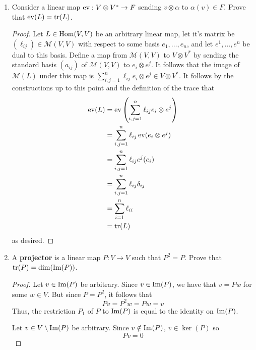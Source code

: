 \documentclass[../psets.tex]{subfiles}
\begin{document}
\begin{enumerate}
\begin{enumerate}
\begin{proof}
            where $1\in\Hom(V,V)$ is the identity map.
        \end{proof}
        \item Consider a linear map $\operatorname{ev}:V\otimes V^*\to F$ sending $v\otimes\alpha$ to $\alpha(v)\in F$. Prove that $\operatorname{ev}(L)=\tr(L)$.
        \begin{proof}
            Let $L\in\operatorname{Hom}(V,V)$ be an arbitrary linear map, let it's matrix be $(\ell_{ij})\in\mathcal{M}(V,V)$ with respect to some basis $e_1,\dots,e_n$, and let $e^1,\dots,e^n$ be dual to this basis. Define a map from $\mathcal{M}(V,V)$ to $V\otimes V^*$ by sending the standard basis $(a_{ij})$ of $\mathcal{M}(V,V)$ to $e_i\otimes e^j$. It follows that the image of $\mathcal{M}(L)$ under this map is $\sum_{i,j=1}^n\ell_{ij}e_i\otimes e^j\in V\otimes V^*$. It follows by the constructions up to this point and the definition of the trace that
            \begingroup
            \allowdisplaybreaks
            \begin{align*}
                \operatorname{ev}(L) &= \operatorname{ev}\left( \sum_{i,j=1}^n\ell_{ij}e_i\otimes e^j \right)\\
                &= \sum_{i,j=1}^n\ell_{ij}\operatorname{ev}(e_i\otimes e^j)\\
                &= \sum_{i,j=1}^n\ell_{ij}e^j(e_i)\\
                &= \sum_{i,j=1}^n\ell_{ij}\delta_{ij}\\
                &= \sum_{i=1}^n\ell_{ii}\\
                &= \tr(L)
            \end{align*}
            \endgroup
            as desired.
        \end{proof}
        \item A \textbf{projector} is a linear map $P:V\to V$ such that $P^2=P$. Prove that $\tr(P)=\dim(\operatorname{Im}(P))$.
        \begin{proof}
            Let $v\in\operatorname{Im}(P)$ be arbitrary. Since $v\in\operatorname{Im}(P)$, we have that $v=Pw$ for some $w\in V$. But since $P=P^2$, it follows that
            \begin{equation*}
                Pv = P^2w = Pw = v
            \end{equation*}
            Thus, the restriction $P_1$ of $P$ to $\operatorname{Im}(P)$ is equal to the identity on $\operatorname{Im}(P)$.\par
            Let $v\in V\setminus\operatorname{Im}(P)$ be arbitrary. Since $v\notin\operatorname{Im}(P)$, $v\in\ker(P)$ so
            \begin{equation*}
                Pv = 0
            \end{equation*}

\end{proof}
\end{enumerate}
\end{enumerate}
\end{document}

